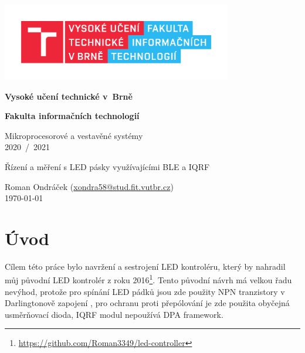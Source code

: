 \documentclass[12pt]{article}
\begin{document}
	\begin{titlepage}
		\begin{center}
			\includegraphics[height = 96pt]{img/FIT_barevne_CMYK_CZ.pdf} \\

			\begin{LARGE}
				\textbf{Vysoké učení technické v~Brně} \\
			\end{LARGE}

			\begin{Large}
				\textbf{Fakulta informačních technologií} \\
			\end{Large}

			\begin{large}
				Mikroprocesorové a vestavěné systémy \\
				2020~/~2021
			\end{large}


			\begin{huge}
				Řízení a měření s LED pásky využívajícími BLE a IQRF \\
			\end{huge}


			\begin{large}
				Roman Ondráček (\href{mailto:xondra58@stud.fit.vutbr.cz}{xondra58@stud.fit.vutbr.cz}) \\
				\today
			\end{large}
		\end{center}
	\end{titlepage}

	\section{Úvod}

	Cílem této práce bylo navržení a sestrojení LED kontroléru, který by nahradil můj původní LED kontrolér z roku 2016\footnote{\url{https://github.com/Roman3349/led-controller}}. Tento původní návrh má velkou řadu nevýhod, protože pro spínání LED pádků jsou zde použity NPN tranzistory v Darlingtonově zapojení , pro ochranu proti přepólování je zde použita obyčejná usměrňovací dioda, IQRF modul nepoužívá DPA framework.
\end{document}
